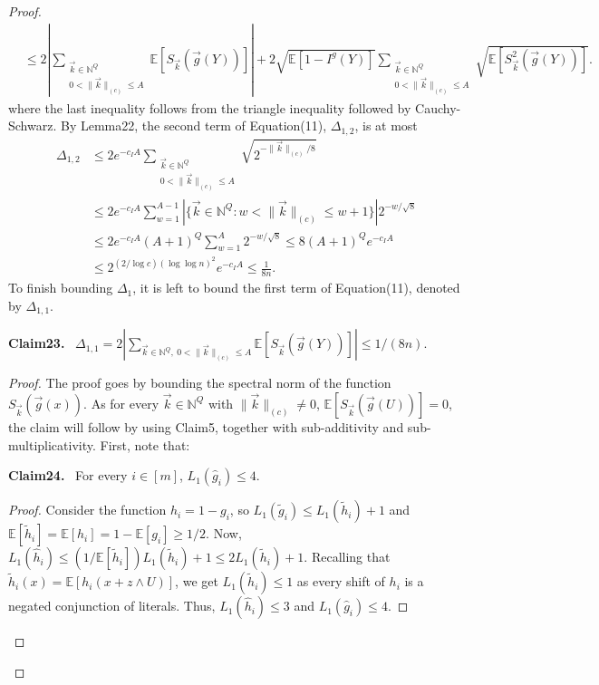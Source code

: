 \documentclass[10pt,a4paper]{article}
\newenvironment{authorclaim}[1]{\par\medskip\noindent\textbf{#1.}\ \ignorespaces}{\par\medskip}
\begin{document}
\begin{proof}
\begin{align}
&\le2\left|\sum_{\substack{\vec k\in\mathbb N^Q\\0<\|\vec k\|_{(c)}\le A}}\mathbb E[S_{\vec k}(\vec g(Y))]\right|
+2\sqrt{\mathbb E[1-I^g(Y)]}\sum_{\substack{\vec k\in\mathbb N^Q\\0<\|\vec k\|_{(c)}\le A}}\sqrt{\mathbb E[S_{\vec k}^2(\vec g(Y))]}.\tag{11}
\end{align}
where the last inequality follows from the triangle inequality followed by Cauchy-Schwarz.
By Lemma22, the second term of Equation(11), $\Delta_{1,2}$, is at most
\begin{align*}
\Delta_{1,2}
&\le2e^{-c_IA}\sum_{\substack{\vec k\in\mathbb N^Q\\0<\|\vec k\|_{(c)}\le A}}\sqrt{2^{-\|\vec k\|_{(c)}/8}}\\
&\le2e^{-c_IA}\sum_{w=1}^{A-1}|\{\vec k\in\mathbb N^Q:w<\|\vec k\|_{(c)}\le w+1\}|2^{-w/\sqrt8}\\
&\le2e^{-c_IA}(A+1)^Q\sum_{w=1}^A2^{-w/\sqrt8}
\le8(A+1)^Qe^{-c_IA}\\
&\le2^{(2/\log c)(\log\log n)^2}e^{-c_IA}\le\frac1{8n}.
\end{align*}
To finish bounding $\Delta_1$, it is left to bound the first term of Equation(11), denoted by $\Delta_{1,1}$.
\begin{authorclaim}{Claim23}
$\Delta_{1,1}=2|\sum_{\vec k\in\mathbb N^Q,\ 0<\|\vec k\|_{(c)}\le A}\mathbb E[S_{\vec k}(\vec g(Y))]|\le1/(8n)$.
\end{authorclaim}
\begin{proof}
The proof goes by bounding the spectral norm of the function $S_{\vec k}(\vec g(x))$. As for every $\vec k\in\mathbb N^Q$ with $\|\vec k\|_{(c)}\ne0$, $\mathbb E[S_{\vec k}(\vec g(U))]=0$, the claim will follow by using Claim5, together with sub-additivity and sub-multiplicativity. First, note that:
\begin{authorclaim}{Claim24}
For every $i\in[m]$, $L_1(\widehat g_i)\le4$.
\end{authorclaim}
\begin{proof}
Consider the function $h_i=1-g_i$, so $L_1(\widetilde g_i)\le L_1(\widetilde h_i)+1$ and $\mathbb E[\widetilde h_i]=\mathbb E[h_i]=1-\mathbb E[g_i]\ge1/2$. Now,
$L_1(\widehat h_i)\le(1/\mathbb E[\widetilde h_i])L_1(\widetilde h_i)+1\le2L_1(\widetilde h_i)+1$. Recalling that $\widetilde h_i(x)=\mathbb E[h_i(x+z\wedge U)]$, we get $L_1(\widetilde h_i)\le1$ as every shift of $h_i$ is a negated conjunction of literals. Thus, $L_1(\widehat h_i)\le3$ and $L_1(\widehat g_i)\le4$.
\end{proof}

\end{proof}
\end{proof}
\end{document}
